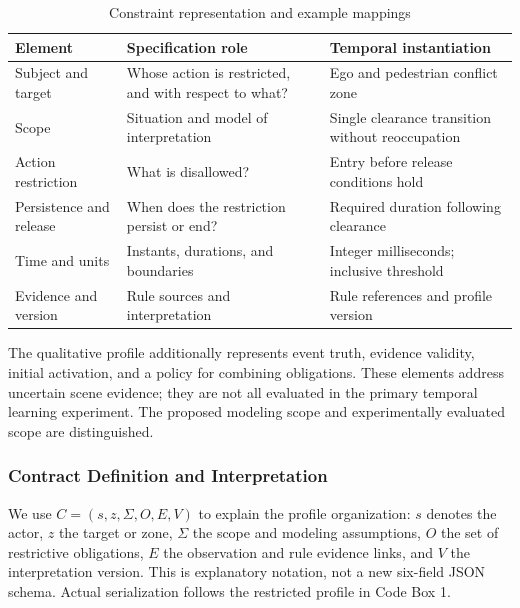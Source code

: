 \documentclass[nolineno]{ieeeaccess}
\begin{document}
\begin{table}[tp]\caption{Constraint representation and example mappings}
\centering\fontsize{8}{10}\selectfont\setlength{\tabcolsep}{3pt}
\begin{tabular}{@{}>{\raggedright\arraybackslash}p{}>{\raggedright\arraybackslash}p{}>{\raggedright\arraybackslash}p{}@{}}
\toprule
\textbf{Element} & \textbf{Specification role} & \textbf{Temporal instantiation}\\
\midrule
Subject and target & Whose action is restricted, and with respect to what? & Ego and pedestrian conflict zone\\[3pt]
Scope & Situation and model of interpretation & Single clearance transition without reoccupation\\[3pt]
Action restriction & What is disallowed? & Entry before release conditions hold\\[3pt]
Persistence and release & When does the restriction persist or end? & Required duration following clearance\\[3pt]
Time and units & Instants, durations, and boundaries & Integer milliseconds; inclusive threshold\\[3pt]
Evidence and version & Rule sources and interpretation & Rule references and profile version\\[3pt]
\bottomrule\end{tabular}
\end{table}

The qualitative profile additionally represents event truth, evidence validity, initial activation, and a policy for combining obligations. These elements address uncertain scene evidence; they are not all evaluated in the primary temporal learning experiment. The proposed modeling scope and experimentally evaluated scope are distinguished.\par

\subsubsection{Contract Definition and Interpretation}

We use $C = (s, z, \Sigma, O, E, V)$ to explain the profile organization: $s$ denotes the actor, $z$ the target or zone, $\Sigma$ the scope and modeling assumptions, $O$ the set of restrictive obligations, $E$ the observation and rule evidence links, and $V$ the interpretation version. This is explanatory notation, not a new six-field JSON schema. Actual serialization follows the restricted profile in Code Box 1.\par
\end{document}
